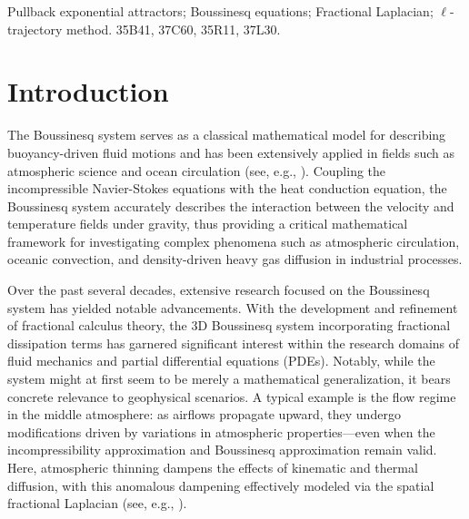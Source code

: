 \documentclass[oneside,preprint,12pt,numbers,sort&compress]{elsarticle}
\begin{document}
\begin{frontmatter}
\begin{keyword} Pullback exponential attractors;  Boussinesq equations; Fractional Laplacian; $\ell$-trajectory method.
\MSC[2020] 35B41, 37C60, 35R11, 37L30.
\end{keyword}
\end{frontmatter}

\section{Introduction}
The Boussinesq system serves as a classical mathematical model for describing buoyancy-driven fluid motions and has been extensively applied in fields such as atmospheric science and ocean circulation (see, e.g., \cite{Gill1982,Pedlosky1987,CD1999,MB2002}). Coupling the incompressible Navier-Stokes equations with the heat conduction equation, the Boussinesq system accurately describes the interaction between the velocity and temperature fields under gravity, thus providing a critical mathematical framework for investigating complex phenomena such as atmospheric circulation, oceanic convection, and density-driven heavy gas diffusion in industrial processes. 

Over the past several decades, extensive research focused on the Boussinesq system has yielded notable advancements. With the development and refinement of fractional calculus theory, the 3D Boussinesq system incorporating fractional dissipation terms has garnered significant interest within the research domains of fluid mechanics and partial differential equations (PDEs). Notably, while the system might at first seem to be merely a mathematical generalization, it bears concrete relevance to geophysical scenarios. A typical example is the flow regime in the middle atmosphere: as airflows propagate upward, they undergo modifications driven by variations in atmospheric properties—even when the incompressibility approximation and Boussinesq approximation remain valid. Here, atmospheric thinning dampens the effects of kinematic and thermal diffusion, with this anomalous dampening effectively modeled via the spatial fractional Laplacian (see, e.g., \cite{Gill1982}).
\end{document}
